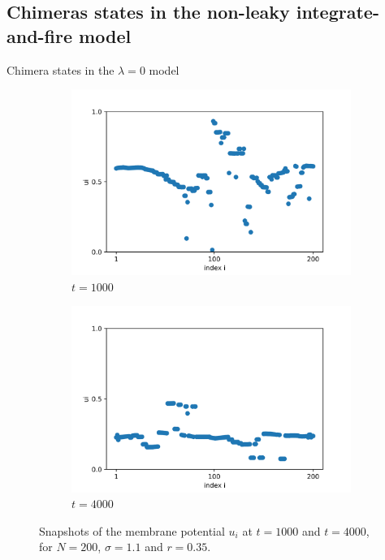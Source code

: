 \documentclass{beamer}
\begin{document}
\subsection{Chimeras states in the non-leaky integrate-and-fire model}
\begin{frame}{Chimera states in the $\lambda = 0$ model} \pause

\begin{figure}[H]
\begin{subfigure}{0.49 \textwidth}
\centering
\includegraphics[width=\linewidth]{u_N=200_sigma=1.4_t=1000.png}
\caption{$t=1000$}
\end{subfigure}
\hfill
\begin{subfigure}{0.49 \textwidth}
\includegraphics[width = \linewidth]{u_N=200_sigma=1.4_t=4000.png}
\caption{$t=4000$}
\end{subfigure}
\caption{Snapshots of the membrane potential $u_i$ at $t=1000$ and $t=4000$, for $N=200$, $\sigma=1.1$ and $r=0.35$.}
\label{1.4}
\end{figure}
\end{frame}
\end{document}
